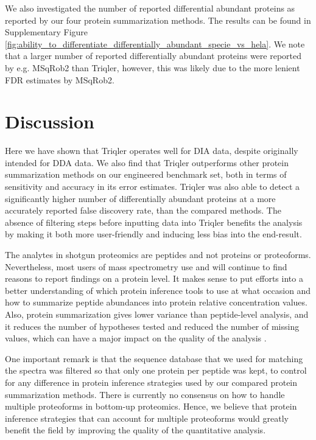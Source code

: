 \documentclass[10pt,letterpaper]{article}
\begin{document}
We also investigated the number of reported differential abundant proteins as reported by our four protein summarization methods. The results can be found in Supplementary Figure \ref{fig:ability_to_differentiate_differentially_abundant_specie_vs_hela}. We note that a larger number of reported differentially abundant proteins were reported by e.g. MSqRob2 than Triqler, however, this was likely due to the more lenient FDR estimates by MSqRob2.



\section*{Discussion}


Here we have shown that Triqler operates well for DIA data, despite originally intended for DDA data. We also find that Triqler outperforms other protein summarization methods on our engineered benchmark set, both in terms of sensitivity and accuracy in its error estimates. Triqler was also able to detect a significantly higher number of differentially abundant proteins at a more accurately reported false discovery rate, than the compared methods. The absence of filtering steps before inputting data into Triqler benefits the analysis by making it both more user-friendly and inducing less bias into the end-result. 

The analytes in shotgun proteomics are peptides and not proteins or proteoforms. Nevertheless, most users of mass spectrometry use and will continue to find reasons to report findings on a protein level. It makes sense to put efforts into a better understanding of which protein inference tools to use at what occasion and how to summarize peptide abundances into protein relative concentration values.  Also, protein summarization gives lower variance than peptide-level analysis, and it reduces the number of hypotheses tested and reduced the number of missing values, which can have a major impact on the quality of the analysis \cite{plubell2021can}.   

One important remark is that the sequence database that we used for matching the spectra was filtered so that only one protein per peptide was kept, to control for any difference in protein inference strategies used by our compared protein summarization methods. There is currently no consensus on how to handle multiple proteoforms in bottom-up proteomics. Hence, we believe that protein inference strategies that can account for multiple proteoforms would greatly benefit the field by improving the quality of the quantitative analysis. 
\end{document}
